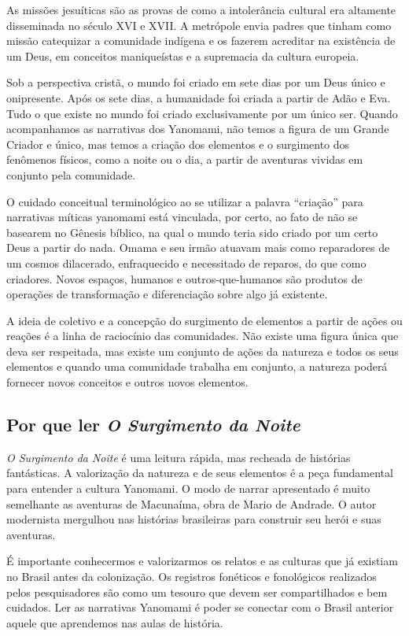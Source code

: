 \documentclass[12pt]{extarticle}
\begin{document}
As missões jesuíticas são as provas de como a intolerância cultural era
altamente disseminada no século XVI e XVII. A metrópole envia padres que
tinham como missão catequizar a comunidade indígena e os fazerem
acreditar na existência de um Deus, em conceitos maniqueístas e a
supremacia da cultura europeia.

Sob a perspectiva cristã, o mundo foi criado em sete dias por um Deus
único e onipresente. Após os sete dias, a humanidade foi criada a partir
de Adão e Eva. Tudo o que existe no mundo foi criado exclusivamente por
um único ser. Quando acompanhamos as narrativas dos Yanomami, não temos
a figura de um Grande Criador e único, mas temos a criação dos elementos
e o surgimento dos fenômenos físicos, como a noite ou o dia, a partir de
aventuras vividas em conjunto pela comunidade.

O cuidado conceitual terminológico ao se utilizar a palavra “criação” para 
narrativas míticas yanomami está vinculada, por certo,  ao fato de não se 
basearem no Gênesis bíblico, na qual o mundo teria sido criado por um certo 
Deus a partir do nada. Omama e seu irmão atuavam mais como reparadores de um 
cosmos dilacerado, enfraquecido e necessitado de reparos, do que como criadores. 
Novos espaços, humanos e outros-que-humanos são produtos de operações de 
transformação e diferenciação sobre algo já existente. 

A ideia de coletivo e a concepção do surgimento de elementos a partir de
ações ou reações é a linha de raciocínio das comunidades. Não existe uma
figura única que deva ser respeitada, mas existe um conjunto de ações da
natureza e todos os seus elementos e quando uma comunidade trabalha em
conjunto, a natureza poderá fornecer novos conceitos e outros novos
elementos.

\subsection{Por que ler \emph{O Surgimento da Noite}}

\emph{O Surgimento da Noite} é uma leitura rápida, mas recheada de
histórias fantásticas. A valorização da natureza e de seus elementos é a
peça fundamental para entender a cultura Yanomami. O modo de narrar
apresentado é muito semelhante as aventuras de Macunaíma, obra de Mario
de Andrade. O autor modernista mergulhou nas histórias brasileiras para
construir seu herói e suas aventuras.

É importante conhecermos e valorizarmos os relatos e as culturas que já
existiam no Brasil antes da colonização. Os registros fonéticos e
fonológicos realizados pelos pesquisadores são como um tesouro que devem
ser compartilhados e bem cuidados. Ler as narrativas Yanomami é poder
se conectar com o Brasil anterior aquele que aprendemos nas aulas de
história.
\end{document}
